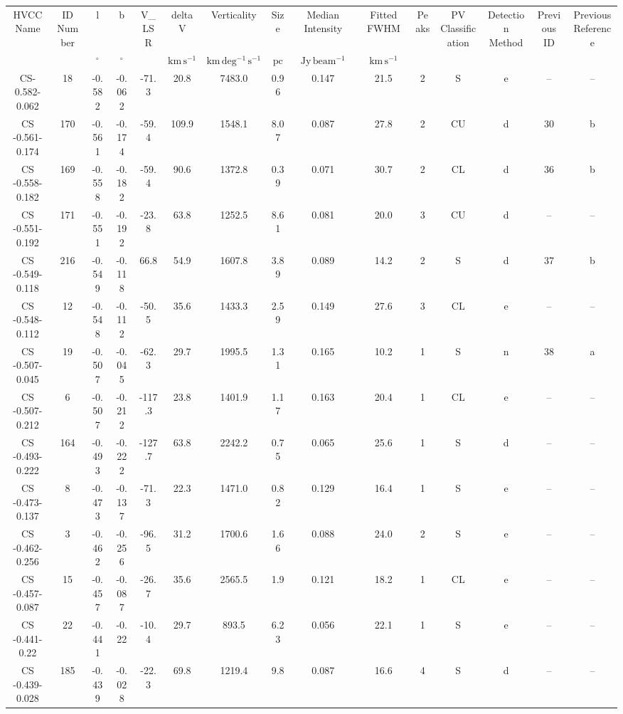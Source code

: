 \begin{table}
\begin{tabular}{ccccccccccccccc}
HVCC Name & ID Number & l & b & V_LSR & deltaV & Verticality & Size & Median Intensity & Fitted FWHM & Peaks & PV Classification & Detection Method & Previous ID & Previous Reference \\
 &  & $\mathrm{{}^{\circ}}$ & $\mathrm{{}^{\circ}}$ &  & $\mathrm{km\,s^{-1}}$ & $\mathrm{km\,deg^{-1}\,s^{-1}}$ & $\mathrm{pc}$ & $\mathrm{Jy\,beam^{-1}}$ & $\mathrm{km\,s^{-1}}$ &  &  &  &  &  \\
CS-0.582-0.062 & 18 & -0.582 & -0.062 & -71.3 & 20.8 & 7483.0 & 0.96 & 0.147 & 21.5 & 2 & S & e & -- & -- \\
CS -0.561-0.174 & 170 & -0.561 & -0.174 & -59.4 & 109.9 & 1548.1 & 8.07 & 0.087 & 27.8 & 2 & CU & d & 30 & b \\
CS -0.558-0.182 & 169 & -0.558 & -0.182 & -59.4 & 90.6 & 1372.8 & 0.39 & 0.071 & 30.7 & 2 & CL & d & 36 & b \\
CS -0.551-0.192 & 171 & -0.551 & -0.192 & -23.8 & 63.8 & 1252.5 & 8.61 & 0.081 & 20.0 & 3 & CU & d & -- & -- \\
CS -0.549-0.118 & 216 & -0.549 & -0.118 & 66.8 & 54.9 & 1607.8 & 3.89 & 0.089 & 14.2 & 2 & S & d & 37 & b \\
CS -0.548-0.112 & 12 & -0.548 & -0.112 & -50.5 & 35.6 & 1433.3 & 2.59 & 0.149 & 27.6 & 3 & CL & e & -- & -- \\
CS -0.507-0.045 & 19 & -0.507 & -0.045 & -62.3 & 29.7 & 1995.5 & 1.31 & 0.165 & 10.2 & 1 & S & n & 38 & a \\
CS -0.507-0.212 & 6 & -0.507 & -0.212 & -117.3 & 23.8 & 1401.9 & 1.17 & 0.163 & 20.4 & 1 & CL & e & -- & -- \\
CS -0.493-0.222 & 164 & -0.493 & -0.222 & -127.7 & 63.8 & 2242.2 & 0.75 & 0.065 & 25.6 & 1 & S & d & -- & -- \\
CS -0.473-0.137 & 8 & -0.473 & -0.137 & -71.3 & 22.3 & 1471.0 & 0.82 & 0.129 & 16.4 & 1 & S & e & -- & -- \\
CS -0.462-0.256 & 3 & -0.462 & -0.256 & -96.5 & 31.2 & 1700.6 & 1.66 & 0.088 & 24.0 & 2 & S & e & -- & -- \\
CS -0.457-0.087 & 15 & -0.457 & -0.087 & -26.7 & 35.6 & 2565.5 & 1.9 & 0.121 & 18.2 & 1 & CL & e & -- & -- \\
CS -0.441-0.22 & 22 & -0.441 & -0.22 & -10.4 & 29.7 & 893.5 & 6.23 & 0.056 & 22.1 & 1 & S & e & -- & -- \\
CS -0.439-0.028 & 185 & -0.439 & -0.028 & -22.3 & 69.8 & 1219.4 & 9.8 & 0.087 & 16.6 & 4 & S & d & -- & -- \\

\end{tabular}
\end{table}
